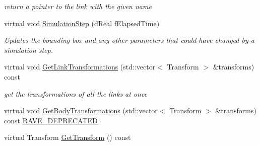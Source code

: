 \begin{DoxyCompactItemize}
\begin{DoxyCompactList}\small\item\em return a pointer to the link with the given name \item\end{DoxyCompactList}\item 
\hypertarget{classOpenRAVE_1_1KinBody_ab51d371d29d7947197b90d8e915de00f}{
virtual void \hyperlink{classOpenRAVE_1_1KinBody_ab51d371d29d7947197b90d8e915de00f}{SimulationStep} (dReal fElapsedTime)}
\label{classOpenRAVE_1_1KinBody_ab51d371d29d7947197b90d8e915de00f}

\begin{DoxyCompactList}\small\item\em Updates the bounding box and any other parameters that could have changed by a simulation step. \item\end{DoxyCompactList}\item 
\hypertarget{classOpenRAVE_1_1KinBody_ad8ee6440e3b5598037f585444639d341}{
virtual void \hyperlink{classOpenRAVE_1_1KinBody_ad8ee6440e3b5598037f585444639d341}{GetLinkTransformations} (std::vector$<$ Transform $>$ \&transforms) const }
\label{classOpenRAVE_1_1KinBody_ad8ee6440e3b5598037f585444639d341}

\begin{DoxyCompactList}\small\item\em get the transformations of all the links at once \item\end{DoxyCompactList}\item 
virtual void \hyperlink{classOpenRAVE_1_1KinBody_a57e27364677e4ade3f7bf0865e7313df}{GetBodyTransformations} (std::vector$<$ Transform $>$ \&transforms) const \hyperlink{namespaceOpenRAVE_af23fc4c2c72950a8c02f38ef71680bc6}{RAVE\_\-DEPRECATED}
\item 
\hypertarget{classOpenRAVE_1_1KinBody_a2206c7317f62f083c3f57868ba82bfee}{
virtual Transform \hyperlink{classOpenRAVE_1_1KinBody_a2206c7317f62f083c3f57868ba82bfee}{GetTransform} () const }
\label{classOpenRAVE_1_1KinBody_a2206c7317f62f083c3f57868ba82bfee}


\end{DoxyCompactItemize}
